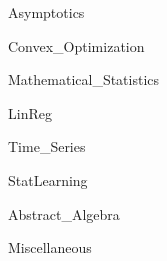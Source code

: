 \documentclass{article}
\numberwithin{equation}{section}
\theoremstyle{definition}
\numberwithin{theorem}{subsection}
\theoremstyle{definition}
\theoremstyle{definition}
\theoremstyle{definition}
\theoremstyle{definition}
\theoremstyle{definition}
\theoremstyle{definition}
\begin{document}
{Asymptotics}

\pagebreak

{Convex_Optimization}

\pagebreak

{Mathematical_Statistics}

\pagebreak

{LinReg}

\pagebreak

{Time_Series}

\pagebreak


{StatLearning}

\pagebreak

{Abstract_Algebra}

\pagebreak

{Miscellaneous}



\end{document}
